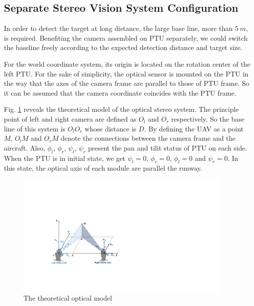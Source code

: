 \subsection{Separate Stereo Vision System Configuration}
In order to detect the target at long distance, the large base line, more than $5\ m $, is required. Benefiting the camera assembled on PTU separately, we could switch the baseline freely according to the expected detection distance and target size.

For the world coordinate system, its origin is located on the rotation center of the left PTU. For the sake of simplicity, the optical sensor is mounted on the PTU in the way that the axes of the camera frame are parallel to those of PTU frame. So it can be assumed that the camera coordinate coincides with the PTU frame. 

Fig. \ref{fig:TheoreticalModel} reveals the theoretical model of the optical stereo system. The principle point of left and right camera are defined as ${O_l}$ and ${O_r}$ respectively. So the base line of this system is $O_lO_r$ whose distance is ${D}$. By defining the UAV as a point $M$, ${O_lM}$ and ${O_rM}$ denote the connections between the camera frame and the aircraft. Also, ${\phi_l}$, ${\phi_r}$, ${\psi_l}$, ${\psi_r}$ present the pan and tilit status of PTU on each side. When the PTU is in initial state, we get ${\psi_l=0}$, $\phi_r=0$, $\phi_l= 0$ and ${\psi_r=0}$. In this state, the optical axis of each module are parallel the runway.  
 

\begin{figure}[!tb]
	\centering
	\includegraphics[height=6cm]{figs/Fig03_Stereo.pdf}	
	\caption{The theoretical optical model}
	\label{fig:TheoreticalModel}
\end{figure}

